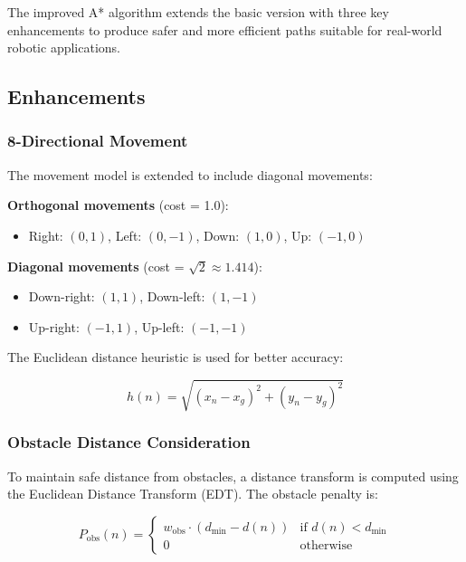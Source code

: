 \documentclass[aps,letterpaper,10pt]{revtex4}
\begin{document}
The improved A* algorithm extends the basic version with three key enhancements to produce safer and more efficient paths suitable for real-world robotic applications.

\subsection{Enhancements}

\subsubsection{8-Directional Movement}

The movement model is extended to include diagonal movements:

\textbf{Orthogonal movements} (cost = 1.0):
\begin{itemize}
    \item Right: $(0, 1)$, Left: $(0, -1)$, Down: $(1, 0)$, Up: $(-1, 0)$
\end{itemize}

\textbf{Diagonal movements} (cost = $\sqrt{2} \approx 1.414$):
\begin{itemize}
    \item Down-right: $(1, 1)$, Down-left: $(1, -1)$
    \item Up-right: $(-1, 1)$, Up-left: $(-1, -1)$
\end{itemize}

The Euclidean distance heuristic is used for better accuracy:

\begin{equation}
h(n) = \sqrt{(x_n - x_g)^2 + (y_n - y_g)^2}
\end{equation}

\subsubsection{Obstacle Distance Consideration}

To maintain safe distance from obstacles, a distance transform is computed using the Euclidean Distance Transform (EDT). The obstacle penalty is:

\begin{equation}
P_{\text{obs}}(n) = \begin{cases}
w_{\text{obs}} \cdot (d_{\text{min}} - d(n)) & \text{if } d(n) < d_{\text{min}} \\
0 & \text{otherwise}
\end{cases}
\end{equation}
\end{document}
